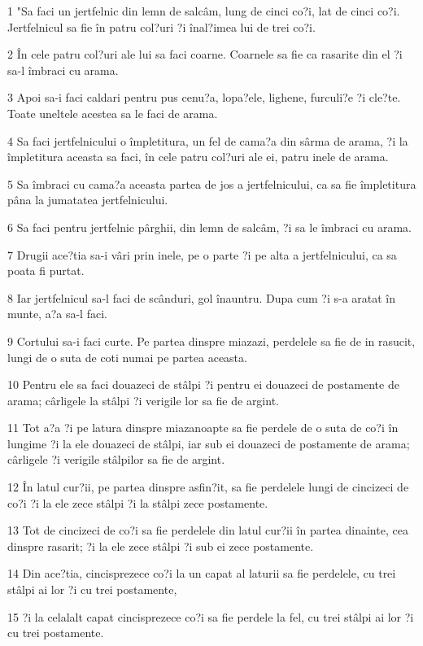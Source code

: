 \par 1 "Sa faci un jertfelnic din lemn de salcâm, lung de cinci co?i, lat de cinci co?i. Jertfelnicul sa fie în patru col?uri ?i înal?imea lui de trei co?i.
\par 2 În cele patru col?uri ale lui sa faci coarne. Coarnele sa fie ca rasarite din el ?i sa-l îmbraci cu arama.
\par 3 Apoi sa-i faci caldari pentru pus cenu?a, lopa?ele, lighene, furculi?e ?i cle?te. Toate uneltele acestea sa le faci de arama.
\par 4 Sa faci jertfelnicului o împletitura, un fel de cama?a din sârma de arama, ?i la împletitura aceasta sa faci, în cele patru col?uri ale ei, patru inele de arama.
\par 5 Sa îmbraci cu cama?a aceasta partea de jos a jertfelnicului, ca sa fie împletitura pâna la jumatatea jertfelnicului.
\par 6 Sa faci pentru jertfelnic pârghii, din lemn de salcâm, ?i sa le îmbraci cu arama.
\par 7 Drugii ace?tia sa-i vâri prin inele, pe o parte ?i pe alta a jertfelnicului, ca sa poata fi purtat.
\par 8 Iar jertfelnicul sa-l faci de scânduri, gol înauntru. Dupa cum ?i s-a aratat în munte, a?a sa-l faci.
\par 9 Cortului sa-i faci curte. Pe partea dinspre miazazi, perdelele sa fie de in rasucit, lungi de o suta de coti numai pe partea aceasta.
\par 10 Pentru ele sa faci douazeci de stâlpi ?i pentru ei douazeci de postamente de arama; cârligele la stâlpi ?i verigile lor sa fie de argint.
\par 11 Tot a?a ?i pe latura dinspre miazanoapte sa fie perdele de o suta de co?i în lungime ?i la ele douazeci de stâlpi, iar sub ei douazeci de postamente de arama; cârligele ?i verigile stâlpilor sa fie de argint.
\par 12 În latul cur?ii, pe partea dinspre asfin?it, sa fie perdelele lungi de cincizeci de co?i ?i la ele zece stâlpi ?i la stâlpi zece postamente.
\par 13 Tot de cincizeci de co?i sa fie perdelele din latul cur?ii în partea dinainte, cea dinspre rasarit; ?i la ele zece stâlpi ?i sub ei zece postamente.
\par 14 Din ace?tia, cincisprezece co?i la un capat al laturii sa fie perdelele, cu trei stâlpi ai lor ?i cu trei postamente,
\par 15 ?i la celalalt capat cincisprezece co?i sa fie perdele la fel, cu trei stâlpi ai lor ?i cu trei postamente.
